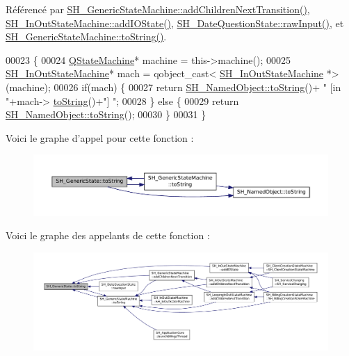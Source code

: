 Référencé par \hyperlink{classSH__GenericStateMachine_a16d844020bc26480bd81d6b794c8364c}{S\-H\-\_\-\-Generic\-State\-Machine\-::add\-Children\-Next\-Transition()}, \hyperlink{classSH__InOutStateMachine_a2528cffddbe6f98c32ebef41423c0118}{S\-H\-\_\-\-In\-Out\-State\-Machine\-::add\-I\-O\-State()}, \hyperlink{classSH__DateQuestionState_a71917e94cb9ce692f916a848bc8c8892}{S\-H\-\_\-\-Date\-Question\-State\-::raw\-Input()}, et \hyperlink{classSH__GenericStateMachine_a85c0c1c9d258ae991f84667412fa47cd}{S\-H\-\_\-\-Generic\-State\-Machine\-::to\-String()}.


\begin{DoxyCode}
00023 \{
00024     \hyperlink{classQStateMachine}{QStateMachine}* machine = this->machine();
00025     \hyperlink{classSH__InOutStateMachine}{SH\_InOutStateMachine}* mach = qobject\_cast<
      \hyperlink{classSH__InOutStateMachine}{SH\_InOutStateMachine} *>(machine);
00026     \textcolor{keywordflow}{if}(mach) \{
00027         \textcolor{keywordflow}{return} \hyperlink{classSH__NamedObject_a9f4b19df6a96a17daaf1060b3019ef47}{SH\_NamedObject::toString}()+ \textcolor{stringliteral}{" [in "}+mach->
      \hyperlink{classSH__GenericStateMachine_a85c0c1c9d258ae991f84667412fa47cd}{toString}()+\textcolor{stringliteral}{"] "};
00028     \} \textcolor{keywordflow}{else} \{
00029         \textcolor{keywordflow}{return} \hyperlink{classSH__NamedObject_a9f4b19df6a96a17daaf1060b3019ef47}{SH\_NamedObject::toString}();
00030     \}
00031 \}
\end{DoxyCode}


Voici le graphe d'appel pour cette fonction \-:\nopagebreak
\begin{figure}[H]
\begin{center}
\leavevmode
\includegraphics[width=350pt]{classSH__GenericState_a7779babbb40f3f8faa71112204d9804f_cgraph}
\end{center}
\end{figure}




Voici le graphe des appelants de cette fonction \-:\nopagebreak
\begin{figure}[H]
\begin{center}
\leavevmode
\includegraphics[width=350pt]{classSH__GenericState_a7779babbb40f3f8faa71112204d9804f_icgraph}
\end{center}
\end{figure}


